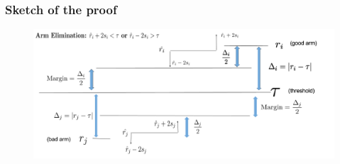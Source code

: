 \begin{frame}
\frametitle{Sketch of the proof}
\begin{figure}
\includegraphics[scale=0.278]{img/ArmElim3.png}
\end{figure}
% 
%
\end{frame}



